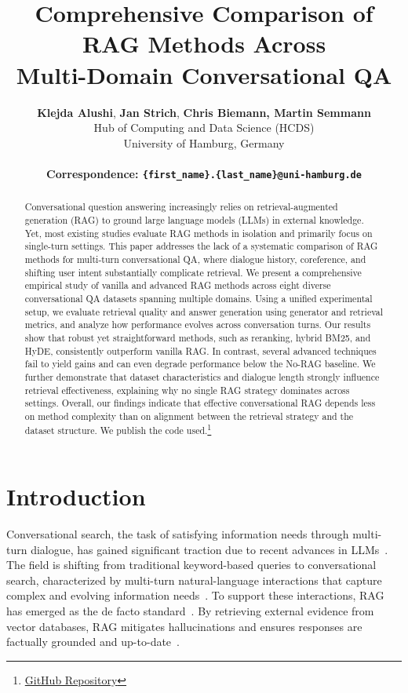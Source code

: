 \documentclass[11pt]{article}
\title{Comprehensive Comparison of RAG Methods Across \\Multi-Domain Conversational QA}
\author{
 \textbf{Klejda Alushi},
 \textbf{Jan Strich},
 \textbf{Chris Biemann,
 \textbf{Martin Semmann}
 }\\
 Hub of Computing and Data Science (HCDS) \\
 University of Hamburg, Germany \\
 \\
 \small{
   \textbf{Correspondence: \texttt{\{first\_name\}.\{last\_name\}@uni-hamburg.de}}
 }
}
\begin{document}
\maketitle

\begin{abstract}
Conversational question answering increasingly relies on retrieval-augmented generation (RAG) to ground large language models (LLMs) in external knowledge. Yet, most existing studies evaluate RAG methods in isolation and primarily focus on single-turn settings. This paper addresses the lack of a systematic comparison of RAG methods for multi-turn conversational QA, where dialogue history, coreference, and shifting user intent substantially complicate retrieval. We present a comprehensive empirical study of vanilla and advanced RAG methods across eight diverse conversational QA datasets spanning multiple domains. Using a unified experimental setup, we evaluate retrieval quality and answer generation using generator and retrieval metrics, and analyze how performance evolves across conversation turns. Our results show that robust yet straightforward methods, such as reranking, hybrid BM25, and HyDE, consistently outperform vanilla RAG.
In contrast, several advanced techniques fail to yield gains and can even degrade performance below the No-RAG baseline. We further demonstrate that dataset characteristics and dialogue length strongly influence retrieval effectiveness, explaining why no single RAG strategy dominates across settings. 
Overall, our findings indicate that effective conversational RAG depends less on method complexity than on alignment between the retrieval strategy and the dataset structure.
We publish the code used.\footnote{\href{https://github.com/Klejda-A/exp-rag.git}{GitHub Repository}}

\end{abstract}

\section{Introduction} \label{ch:1-introduction}
Conversational search, the task of satisfying information needs through multi-turn dialogue, has gained significant traction due to recent advances in LLMs~\citep{mo_survey_2025}.
The field is shifting from traditional keyword-based queries to conversational search, characterized by multi-turn natural-language interactions that capture complex and evolving information needs~\citep{mo_survey_2025, prayitno_conversational_2025}. 
To support these interactions, RAG has emerged as the de facto standard~\citep{lewis_retrievalaugmented_2020, huang_survey_2024, nikishina_creating_2025}. By retrieving external evidence from vector databases, RAG mitigates hallucinations and ensures responses are factually grounded and up-to-date~\citep{shuster_retrieval_2021, sahoo_comprehensive_2024}.
\end{document}
